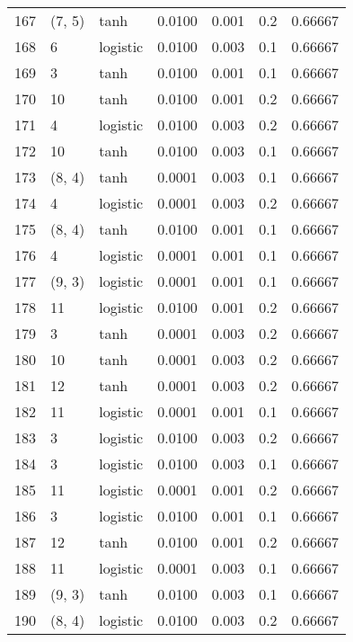 \begin{tabular}{lllrrrr}
167 &      (7, 5) &      tanh &  0.0100 &  0.001 &  0.2 &   0.66667 \\
168 &           6 &  logistic &  0.0100 &  0.003 &  0.1 &   0.66667 \\
169 &           3 &      tanh &  0.0100 &  0.001 &  0.1 &   0.66667 \\
170 &          10 &      tanh &  0.0100 &  0.001 &  0.2 &   0.66667 \\
171 &           4 &  logistic &  0.0100 &  0.003 &  0.2 &   0.66667 \\
172 &          10 &      tanh &  0.0100 &  0.003 &  0.1 &   0.66667 \\
173 &      (8, 4) &      tanh &  0.0001 &  0.003 &  0.1 &   0.66667 \\
174 &           4 &  logistic &  0.0001 &  0.003 &  0.2 &   0.66667 \\
175 &      (8, 4) &      tanh &  0.0100 &  0.001 &  0.1 &   0.66667 \\
176 &           4 &  logistic &  0.0001 &  0.001 &  0.1 &   0.66667 \\
177 &      (9, 3) &  logistic &  0.0001 &  0.001 &  0.1 &   0.66667 \\
178 &          11 &  logistic &  0.0100 &  0.001 &  0.2 &   0.66667 \\
179 &           3 &      tanh &  0.0001 &  0.003 &  0.2 &   0.66667 \\
180 &          10 &      tanh &  0.0001 &  0.003 &  0.2 &   0.66667 \\
181 &          12 &      tanh &  0.0001 &  0.003 &  0.2 &   0.66667 \\
182 &          11 &  logistic &  0.0001 &  0.001 &  0.1 &   0.66667 \\
183 &           3 &  logistic &  0.0100 &  0.003 &  0.2 &   0.66667 \\
184 &           3 &  logistic &  0.0100 &  0.003 &  0.1 &   0.66667 \\
185 &          11 &  logistic &  0.0001 &  0.001 &  0.2 &   0.66667 \\
186 &           3 &  logistic &  0.0100 &  0.001 &  0.1 &   0.66667 \\
187 &          12 &      tanh &  0.0100 &  0.001 &  0.2 &   0.66667 \\
188 &          11 &  logistic &  0.0001 &  0.003 &  0.1 &   0.66667 \\
189 &      (9, 3) &      tanh &  0.0100 &  0.003 &  0.1 &   0.66667 \\
190 &      (8, 4) &  logistic &  0.0100 &  0.003 &  0.2 &   0.66667 \\

\end{tabular}
